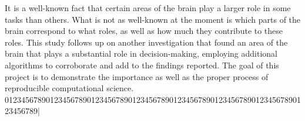
\par It is a well-known fact that certain areas of the brain play a larger role
in some tasks than others. What is not as well-known at the moment is which
parts of the brain correspond to what roles, as well as how much they contribute
to these roles. This study follows up on another investigation that found an
area of the brain that plays a substantial role in decision-making, employing
additional algorithms to corroborate and add to the findings reported. The goal
of this project is to demonstrate the importance as well as the proper process
of reproducible computational science.
01234567890123456789012345678901234567890123456789012345678901234567890123456789|
